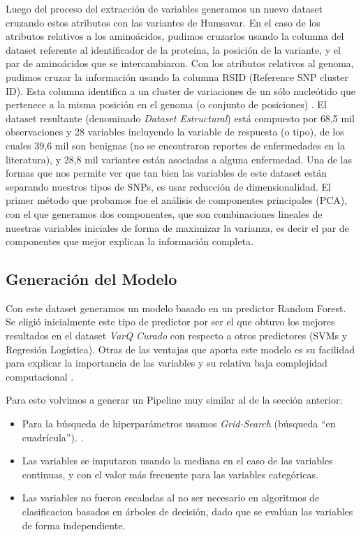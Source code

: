 Luego del proceso del extracción de variables generamos un nuevo dataset cruzando estos atributos con las variantes de Humsavar. En el caso de los atributos relativos a los aminoácidos, pudimos cruzarlos usando la columna del dataset referente al identificador de la proteína, la posición de la variante, y el par de aminoácidos que se intercambiaron. Con los atributos relativos al genoma, pudimos cruzar la información usando la columna RSID (Reference SNP cluster ID). Esta columna identifica a un cluster de variaciones de un sólo nucleótido que pertenece a la misma posición en el genoma (o conjunto de posiciones) \cite{Ostell2007}. 
El dataset resultante (denominado \textit{Dataset Estructural}) está compuesto por 68,5 mil observaciones y 28 variables incluyendo la variable de respuesta (o tipo), de los cuales 39,6 mil son benignas (no se encontraron reportes de enfermedades en la literatura), y 28,8 mil variantes están asociadas a alguna enfermedad. 
Una de las formas que nos permite ver que tan bien las variables de este dataset están separando nuestros tipos de SNPs, es usar reducción de dimensionalidad. El primer método que probamos fue el análisis de componentes principales (PCA), con el que generamos dos componentes, que son combinaciones lineales de nuestras variables iniciales de forma de maximizar la varianza, es decir el par de componentes que mejor explican la información completa.


\subsection{Generación del Modelo}

Con este dataset generamos un modelo basado en un predictor Random Forest. 
Se eligió inicialmente este tipo de predictor por ser el que obtuvo los mejores resultados en el dataset \textit{VarQ Curado}  con respecto a otros predictores (SVMs y Regresión Logística). Otras de las ventajas que aporta este modelo es su facilidad para explicar la importancia de las variables y su relativa baja complejidad computacional \todo{[Citar?]}. 

Para esto volvimos a generar un Pipeline muy similar al de la sección anterior:

\begin{itemize}
\item Para la búsqueda de hiperparámetros usamos \textit{Grid-Search} (búsqueda ``en cuadrícula''). . 
\item Las variables se imputaron usando la mediana en el caso de las variables continuas, y con el valor más frecuente para las variables categóricas. 
\item Las variables no fueron escaladas al no ser necesario en algoritmos de clasificacion basados en árboles de decisión, dado que se evalúan las variables de forma independiente. 
\end{itemize}


